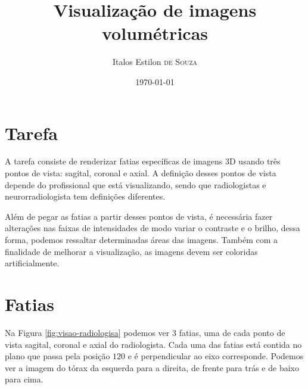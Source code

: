 \documentclass{article}
\title{Visualização de imagens volumétricas} %
\author{Italos Estilon \textsc{de Souza}} %
\date{\today} %
\begin{document}
\maketitle

\section{Tarefa}

A tarefa consiste de renderizar fatias específicas de imagens 3D usando três pontos de vista: sagital, coronal e axial. A definição desses pontos de vista depende do profissional que está visualizando, sendo que radiologistas e neurorradiologista tem definições diferentes.
 
Além de pegar as fatias a partir desses pontos de vista, é necessária fazer alterações nas faixas de intensidades de modo variar o contraste e o brilho, dessa forma, podemos ressaltar determinadas áreas das imagens. Também com a finalidade de melhorar a visualização, as imagens devem ser coloridas artificialmente.

\section{Fatias}
Na Figura \ref{fig:visao-radiologisa} podemos ver 3 fatias, uma de cada ponto de vista sagital, coronal e axial do radiologista. Cada uma das fatias está contida no plano que passa pela posição $120$ e é perpendicular ao eixo corresponde. Podemos ver a imagem do tórax da esquerda para a direita, de frente para trás e de baixo para cima.
\end{document}
